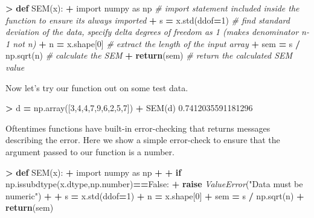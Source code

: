 \documentclass[
]{book}
\newenvironment{Shaded}{\begin{snugshade}}{\end{snugshade}}
\newcommand{\CommentTok}[1]{\textcolor[rgb]{0.56,0.35,0.01}{\textit{#1}}}
\newcommand{\ControlFlowTok}[1]{\textcolor[rgb]{0.13,0.29,0.53}{\textbf{#1}}}
\newcommand{\DecValTok}[1]{\textcolor[rgb]{0.00,0.00,0.81}{#1}}
\newcommand{\FloatTok}[1]{\textcolor[rgb]{0.00,0.00,0.81}{#1}}
\newcommand{\ImportTok}[1]{#1}
\newcommand{\KeywordTok}[1]{\textcolor[rgb]{0.13,0.29,0.53}{\textbf{#1}}}
\newcommand{\NormalTok}[1]{#1}
\newcommand{\OperatorTok}[1]{\textcolor[rgb]{0.81,0.36,0.00}{\textbf{#1}}}
\newcommand{\PreprocessorTok}[1]{\textcolor[rgb]{0.56,0.35,0.01}{\textit{#1}}}
\newcommand{\StringTok}[1]{\textcolor[rgb]{0.31,0.60,0.02}{#1}}
\newcommand{\VariableTok}[1]{\textcolor[rgb]{0.00,0.00,0.00}{#1}}
\begin{document}
\begin{Shaded}
\begin{Highlighting}[]
\OperatorTok{\textgreater{}} \KeywordTok{def}\NormalTok{ SEM(x):}
\OperatorTok{+}   \ImportTok{import}\NormalTok{ numpy }\ImportTok{as}\NormalTok{ np }\CommentTok{\# import statement included inside the function to ensure it\textquotesingle{}s always imported}
\OperatorTok{+}\NormalTok{   s }\OperatorTok{=}\NormalTok{ x.std(ddof}\OperatorTok{=}\DecValTok{1}\NormalTok{) }\CommentTok{\# find standard deviation of the data, specify delta degrees of freedom as 1 (makes denominator n{-}1 not n)}
\OperatorTok{+}\NormalTok{   n }\OperatorTok{=}\NormalTok{ x.shape[}\DecValTok{0}\NormalTok{] }\CommentTok{\# extract the length of the input array}
\OperatorTok{+}\NormalTok{   sem }\OperatorTok{=}\NormalTok{ s }\OperatorTok{/}\NormalTok{ np.sqrt(n) }\CommentTok{\# calculate the SEM}
\OperatorTok{+}   \ControlFlowTok{return}\NormalTok{(sem) }\CommentTok{\# return the calculated SEM value}
\end{Highlighting}
\end{Shaded}

Now let's try our function out on some test data.

\begin{Shaded}
\begin{Highlighting}[]
\OperatorTok{\textgreater{}}\NormalTok{ d }\OperatorTok{=}\NormalTok{ np.array([}\DecValTok{3}\NormalTok{,}\DecValTok{4}\NormalTok{,}\DecValTok{4}\NormalTok{,}\DecValTok{7}\NormalTok{,}\DecValTok{9}\NormalTok{,}\DecValTok{6}\NormalTok{,}\DecValTok{2}\NormalTok{,}\DecValTok{5}\NormalTok{,}\DecValTok{7}\NormalTok{])}
\OperatorTok{+}\NormalTok{ SEM(d)}
\FloatTok{0.7412035591181296}
\end{Highlighting}
\end{Shaded}

Oftentimes functions have built-in error-checking that returns messages describing the error. Here we show a simple error-check to ensure that the argument passed to our function is a number.

\begin{Shaded}
\begin{Highlighting}[]
\OperatorTok{\textgreater{}} \KeywordTok{def}\NormalTok{ SEM(x):}
\OperatorTok{+}   \ImportTok{import}\NormalTok{ numpy }\ImportTok{as}\NormalTok{ np}
\OperatorTok{+}   
\OperatorTok{+}   \ControlFlowTok{if}\NormalTok{ np.issubdtype(x.dtype,np.number)}\OperatorTok{==}\VariableTok{False}\NormalTok{:}
\OperatorTok{+}     \ControlFlowTok{raise} \PreprocessorTok{ValueError}\NormalTok{(}\StringTok{"Data must be numeric"}\NormalTok{)}
\OperatorTok{+}   
\OperatorTok{+}\NormalTok{   s }\OperatorTok{=}\NormalTok{ x.std(ddof}\OperatorTok{=}\DecValTok{1}\NormalTok{) }
\OperatorTok{+}\NormalTok{   n }\OperatorTok{=}\NormalTok{ x.shape[}\DecValTok{0}\NormalTok{] }
\OperatorTok{+}\NormalTok{   sem }\OperatorTok{=}\NormalTok{ s }\OperatorTok{/}\NormalTok{ np.sqrt(n) }
\OperatorTok{+}   \ControlFlowTok{return}\NormalTok{(sem) }
\end{Highlighting}
\end{Shaded}
\end{document}

